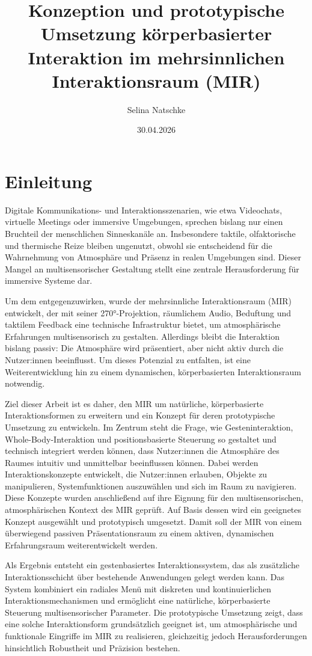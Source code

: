 \documentclass[12pt]{article}\usepackage{graphicx} %
\title{Konzeption und prototypische Umsetzung körper\-basierter Interaktion im mehrsinnlichen Interaktionsraum (MIR)}
\author{Selina Natschke}
\date{30.04.2026}
\begin{document}

\clearpage

\clearpage
\tableofcontents

\clearpage
\section{Einleitung}
Digitale Kommunikations- und Interaktionsszenarien, wie etwa Videochats, virtuelle Meetings oder immersive Umgebungen, sprechen bislang nur einen Bruchteil der menschlichen Sinneskanäle an. Insbesondere taktile, olfaktorische und thermische Reize bleiben ungenutzt, obwohl sie entscheidend für die Wahrnehmung von Atmosphäre und Präsenz in realen Umgebungen sind. Dieser Mangel an multisensorischer Gestaltung stellt eine zentrale Herausforderung für immersive Systeme dar.

Um dem entgegenzuwirken, wurde der mehrsinnliche Interaktionsraum (MIR) \parencite{orawetz2024mir} entwickelt, der mit seiner 270°-Projektion, räumlichem Audio, Beduftung und taktilem Feedback eine technische Infrastruktur bietet, um atmosphärische Erfahrungen multisensorisch zu gestalten.
Allerdings bleibt die Interaktion bislang passiv: Die Atmosphäre wird präsentiert, aber nicht aktiv durch die Nutzer:innen beeinflusst. Um dieses Potenzial zu entfalten, ist eine Weiterentwicklung hin zu einem dynamischen, körper\-basierten Interaktionsraum notwendig.

Ziel dieser Arbeit ist es daher, den MIR um natürliche, körper\-basierte Interaktionsformen zu erweitern und ein Konzept für deren prototypische Umsetzung zu entwickeln. Im Zentrum steht die Frage, wie Gesteninteraktion, Whole-Body-Interaktion und positionsbasierte Steuerung so gestaltet und technisch integriert werden können, dass Nutzer:innen die Atmosphäre des Raumes intuitiv und unmittelbar beeinflussen können. Dabei werden Interaktionskonzepte entwickelt, die Nutzer:innen erlauben, Objekte zu manipulieren, Systemfunktionen auszuwählen und sich im Raum zu navigieren. Diese Konzepte wurden anschließend auf ihre Eignung für den multisensorischen, atmosphärischen Kontext des MIR geprüft. Auf Basis dessen wird ein geeignetes Konzept ausgewählt und prototypisch umgesetzt.
Damit soll der MIR von einem überwiegend passiven Präsentationsraum zu einem aktiven, dynamischen Erfahrungsraum weiterentwickelt werden.

Als Ergebnis entsteht ein gestenbasiertes Interaktionssystem, das als zusätzliche Interaktionsschicht über bestehende Anwendungen gelegt werden kann. Das System kombiniert ein radiales Menü mit diskreten und kontinuierlichen Interaktionsmechanismen und ermöglicht eine natürliche, körper\-basierte Steuerung multisensorischer Parameter. Die prototypische Umsetzung zeigt, dass eine solche Interaktionsform grund\-sätzlich geeignet ist, um atmosphärische und funktionale Eingriffe im MIR zu realisieren, gleichzeitig jedoch Herausforderungen hinsichtlich Robustheit und Präzision bestehen.
\end{document}
